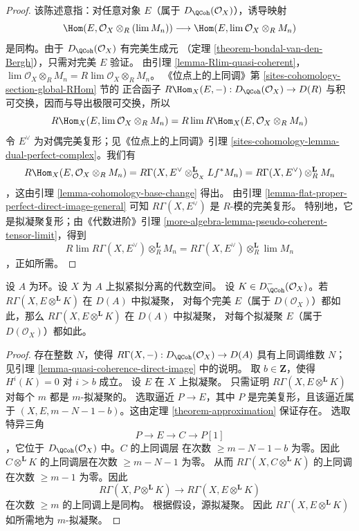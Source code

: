 \begin{proof}
该陈述意指：对任意对象 $E$（属于
$D_\QCoh(\mathcal{O}_X)$），诱导映射
$$
\Hom(E, \mathcal{O}_X \otimes_R (\lim M_n))
\longrightarrow
\Hom(E, \lim \mathcal{O}_X \otimes_R M_n)
$$
是同构。由于 $D_\QCoh(\mathcal{O}_X)$ 有完美生成元
（定理 \ref{theorem-bondal-van-den-Bergh}），只需对完美 $E$ 验证。
由引理 \ref{lemma-Rlim-quasi-coherent}，
$\lim \mathcal{O}_X \otimes_R M_n = R\lim \mathcal{O}_X \otimes_R M_n$。
《位点上的上同调》第 \ref{sites-cohomology-section-global-RHom} 节的
正合函子
$R\Hom_X(E, -) : D_\QCoh(\mathcal{O}_X) \to D(R)$
与积可交换，因而与导出极限可交换，所以
$$
R\Hom_X(E, \lim \mathcal{O}_X \otimes_R M_n) =
R\lim R\Hom_X(E, \mathcal{O}_X \otimes_R M_n)
$$
令 $E^\vee$ 为对偶完美复形；见《位点上的上同调》引理
\ref{sites-cohomology-lemma-dual-perfect-complex}。我们有
$$
R\Hom_X(E, \mathcal{O}_X \otimes_R M_n) =
R\Gamma(X, E^\vee \otimes_{\mathcal{O}_X}^\mathbf{L} Lf^*M_n) =
R\Gamma(X, E^\vee) \otimes_R^\mathbf{L} M_n
$$
，这由引理 \ref{lemma-cohomology-base-change} 得出。
由引理 \ref{lemma-flat-proper-perfect-direct-image-general} 可知
$R\Gamma(X, E^\vee)$ 是 $R$-模的完美复形。
特别地，它是拟凝聚复形；由《代数进阶》引理
\ref{more-algebra-lemma-pseudo-coherent-tensor-limit}，得到
$$
R\lim R\Gamma(X, E^\vee) \otimes_R^\mathbf{L} M_n =
R\Gamma(X, E^\vee) \otimes_R^\mathbf{L} \lim M_n
$$
，正如所需。
\end{proof}

\begin{lemma}
\label{lemma-perfect-enough}
设 $A$ 为环。设 $X$ 为 $A$ 上拟紧拟分离的代数空间。
设 $K \in D^-_\QCoh(\mathcal{O}_X)$。若
$R\Gamma(X, E \otimes^\mathbf{L} K)$ 在 $D(A)$ 中拟凝聚，
对每个完美 $E$（属于 $D(\mathcal{O}_X)$）都如此，那么
$R\Gamma(X, E \otimes^\mathbf{L} K)$ 在 $D(A)$ 中拟凝聚，
对每个拟凝聚 $E$（属于 $D(\mathcal{O}_X)$）都如此。
\end{lemma}

\begin{proof}
存在整数 $N$，使得
$R\Gamma(X, -) : D_\QCoh(\mathcal{O}_X) \to D(A)$
具有上同调维数 $N$；见引理
\ref{lemma-quasi-coherence-direct-image} 中的说明。
取 $b \in \mathbf{Z}$，使得 $H^i(K) = 0$ 对 $i > b$ 成立。
设 $E$ 在 $X$ 上拟凝聚。
只需证明 $R\Gamma(X, E \otimes^\mathbf{L} K)$
对每个 $m$ 都是 $m$-拟凝聚的。
选取逼近 $P \to E$，其中 $P$ 是完美复形，且该逼近属于
$(X, E, m - N - 1 - b)$。这由定理
\ref{theorem-approximation} 保证存在。
选取特异三角
$$
P \to E \to C \to P[1]
$$
，它位于 $D_\QCoh(\mathcal{O}_X)$ 中。$C$ 的上同调层
在次数 $\geq m - N - 1 - b$ 为零。因此
$C \otimes^\mathbf{L} K$ 的上同调层在次数
$\geq m - N - 1$ 为零。
从而 $R\Gamma(X, C \otimes^\mathbf{L} K)$ 的上同调 %
在次数 $\geq m - 1$ 为零。因此
$$
R\Gamma(X, P \otimes^\mathbf{L} K) \to R\Gamma(X, E \otimes^\mathbf{L} K)
$$
在次数 $\geq m$ 的上同调上是同构。
根据假设，源拟凝聚。
因此 $R\Gamma(X, E \otimes^\mathbf{L} K)$
如所需地为 $m$-拟凝聚。
\end{proof}

